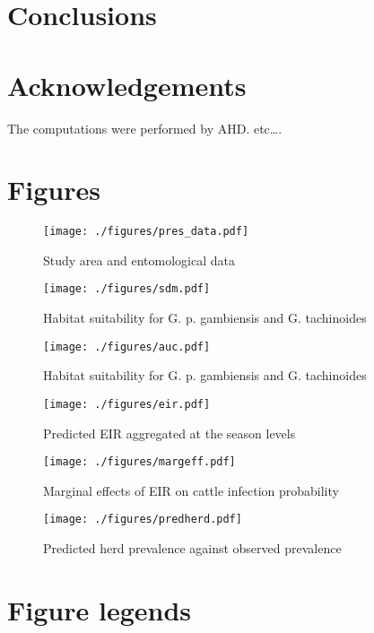 \documentclass[10pt]{article}
\begin{document}
\section*{Conclusions}
\label{unnumbered-20}
\section*{Acknowledgements}
\label{unnumbered-21}
The computations were performed by AHD. etc\ldots{}.



\section*{Figures}
\label{unnumbered-22}

\begin{figure}[H]
\centering
\texttt{[image: ./figures/pres\_data.pdf]}
\caption{Study area and entomological data}
\end{figure}

\begin{figure}[H]
\centering
\texttt{[image: ./figures/sdm.pdf]}
\caption{Habitat suitability for G. p. gambiensis and G. tachinoides}
\end{figure}


\begin{figure}[H]
\centering
\texttt{[image: ./figures/auc.pdf]}
\caption{Habitat suitability for G. p. gambiensis and G. tachinoides}
\end{figure}


\begin{figure}[H]
\centering
\texttt{[image: ./figures/eir.pdf]}
\caption{Predicted EIR aggregated at the season levels}
\end{figure}



\begin{figure}[H]
\centering
\texttt{[image: ./figures/margeff.pdf]}
\caption{Marginal effects of EIR on cattle infection probability}
\end{figure}


\begin{figure}[H]
\centering
\texttt{[image: ./figures/predherd.pdf]}
\caption{Predicted herd prevalence against observed prevalence}
\end{figure}

\section*{Figure legends}
\label{unnumbered-23}
\end{document}
